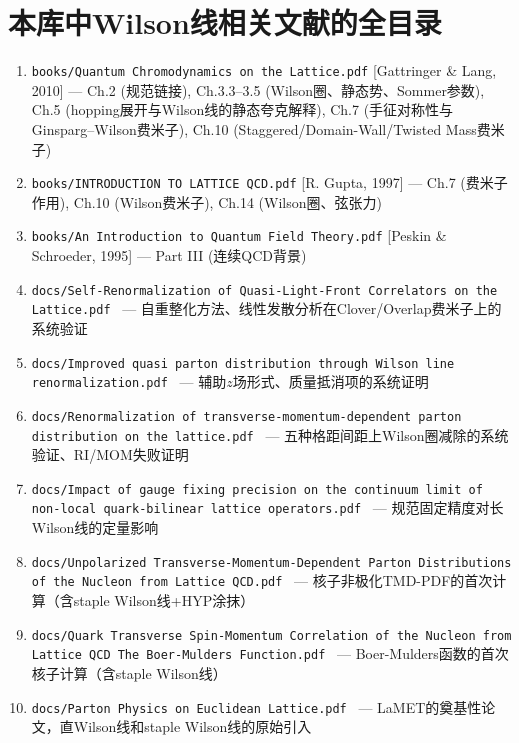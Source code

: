 \documentclass[12pt,a4paper]{ctexart}
\theoremstyle{definition}
\begin{document}
\section*{本库中Wilson线相关文献的全目录}

\small
\begin{enumerate}[leftmargin=*,nosep]
    \item \texttt{books/Quantum Chromodynamics on the Lattice.pdf} [Gattringer \& Lang, 2010] — Ch.2 (规范链接), Ch.3.3--3.5 (Wilson圈、静态势、Sommer参数), Ch.5 (hopping展开与Wilson线的静态夸克解释), Ch.7 (手征对称性与Ginsparg--Wilson费米子), Ch.10 (Staggered/Domain-Wall/Twisted Mass费米子)
    \item \texttt{books/INTRODUCTION TO LATTICE QCD.pdf} [R. Gupta, 1997] — Ch.7 (费米子作用), Ch.10 (Wilson费米子), Ch.14 (Wilson圈、弦张力)
    \item \texttt{books/An Introduction to Quantum Field Theory.pdf} [Peskin \& Schroeder, 1995] — Part III (连续QCD背景)
    \item \texttt{docs/Self-Renormalization of Quasi-Light-Front Correlators on the Lattice.pdf}~\cite{Huo2021self} — 自重整化方法、线性发散分析在Clover/Overlap费米子上的系统验证
    \item \texttt{docs/Improved quasi parton distribution through Wilson line renormalization.pdf}~\cite{Chen2018WLrenorm} — 辅助$z$场形式、质量抵消项的系统证明
    \item \texttt{docs/Renormalization of transverse-momentum-dependent parton distribution on the lattice.pdf}~\cite{Zhang2022renormTMD} — 五种格距间距上Wilson圈减除的系统验证、RI/MOM失败证明
    \item \texttt{docs/Impact of gauge fixing precision on the continuum limit of non-local quark-bilinear lattice operators.pdf}~\cite{Zhang2024gauge_fixing} — 规范固定精度对长Wilson线的定量影响
    \item \texttt{docs/Unpolarized Transverse-Momentum-Dependent Parton Distributions of the Nucleon from Lattice QCD.pdf}~\cite{He2024unpolTMD} — 核子非极化TMD-PDF的首次计算（含staple Wilson线+HYP涂抹）
    \item \texttt{docs/Quark Transverse Spin-Momentum Correlation of the Nucleon from Lattice QCD The Boer-Mulders Function.pdf}~\cite{Ma2025BoerMulders} — Boer-Mulders函数的首次核子计算（含staple Wilson线）
    \item \texttt{docs/Parton Physics on Euclidean Lattice.pdf}~\cite{Ji2013Euclidean} — LaMET的奠基性论文，直Wilson线和staple Wilson线的原始引入

\end{enumerate}
\end{document}
